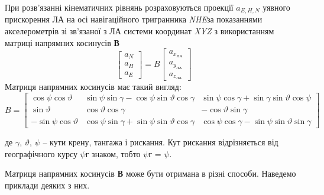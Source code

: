 При розв'язанні кінематичних рівнянь розраховуються проекції $a_{E,H,N} $ уявного 
прискорення ЛА на осі навігаційного тригранника \textit{NHE}за показаннями акселерометрів 
зі зв'язаної з ЛА системи координат \textit{XYZ} з використанням матриці напрямних  
косинусів \textbf{В}
\[ \left[\begin{array}{c} 
{a_{N} } \\ 
{a_{H} } \\ 
{a_{E} }
\end{array}\right]=B
\left[\begin{array}{c} 
{a_{x_{\text{ЛА}} } } \\ 
{a_{y_{\text{ЛА}} } } \\ 
{a_{z_{\text{ЛА}} } } 
\end{array}\right]\] 
Матриця напрямних  косинусів  має такий вигляд:
\[B=\left[\begin{array}{c|c|c} 
{\cos \psi \cos \vartheta } & 
{\sin \psi \sin \gamma -\cos \psi \sin \vartheta \cos \gamma } & 
{\sin \psi \cos \gamma +\sin \gamma \sin \vartheta \cos \psi } \\  \hline {\sin \vartheta } & 
{\cos \vartheta \cos \gamma} & 
{-\cos \vartheta \sin \gamma } \\  \hline {-\sin \psi \cos \vartheta } & 
{\cos \psi \sin \gamma +\sin \psi \sin \vartheta \cos \gamma } & 
{\cos \psi \cos \gamma -\sin \psi \sin \vartheta \sin \gamma } 
\end{array}\right]\] 
\begin{ESKDexplanation}
\item де $\gamma$, $\vartheta$, $\psi$ -- кути крену, тангажа і рискання. Кут рискання 
відрізняється від географічного курсу $\psi$г знаком, тобто $\psi$г = $\psi$.
\end{ESKDexplanation}
Матриця напрямних  косинусів \textbf{В} може бути отримана в різні способи. Наведемо приклади 
деяких з них. 

